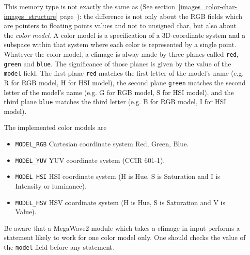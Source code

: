 \def\cfimage{{\tt Cfimage }}
\index{structure!\cfimage}

 This memory type is not exactly the same as \ccimage (See section~\ref{images_color-char-images_structure} page~\pageref{images_color-char-images_structure}): the difference is not
only about the RGB fields which are pointers to floating points values and not to unsigned
char, but also about the {\em color model}. A color model is a specification of a 
3D-coordinate system and a subspace within that system where each color is represented by
a single point. 
Whatever the color model, a cfimage is alway made by three planes called \verb+red+, 
\verb+green+ and \verb+blue+. The significance of those planes is given by the value
of the \verb+model+ field. The first plane \verb+red+ matches the first letter of
the model's name (e.g. R for RGB model, H for HSI model), the second plane \verb+green+ 
matches the second letter of the model's name (e.g. G for RGB model, S for HSI model),
and the third plane \verb+blue+ matches the third letter (e.g. B for RGB model, I for HSI 
model).

The implemented color models are 
\begin{itemize}
\item {\tt MODEL\_RGB} Cartesian coordinate system Red, Green, Blue. 
\item {\tt MODEL\_YUV}  YUV coordinate system (CCIR 601-1).
\item {\tt MODEL\_HSI}  HSI coordinate system (H is Hue, S is Saturation and I is Intensity
or luminance). 
\item {\tt MODEL\_HSV}  HSV coordinate system (H is Hue, S is Saturation and V is Value).
\end{itemize}

Be aware that a MegaWave2 module which takes a cfimage in input performs a statement
likely to work for one color model only. One should checks the value of the \verb+model+ 
field before any statement.

